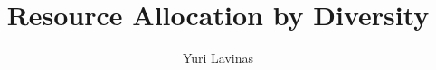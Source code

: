 \documentclass{IEEEtran}
\begin{document}
\title{Resource Allocation by Diversity}
\author{Yuri Lavinas}

\maketitle



\begin{abstract}
	
\end{abstract}








\end{document}
